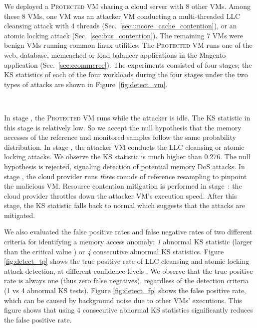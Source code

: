 \documentclass{sig-alternate}
\newcommand{\bheading}[1]{{\vspace{2pt}\noindent{\textbf{#1}}\hspace{2pt}}}
\newcommand{\RNum}[1]{\uppercase\expandafter{\romannumeral #1\relax}}
\newcommand{\attackname}{memory DoS attacks\xspace}
\newcommand{\protectedVM}{\textsc{Protected VM}\xspace}
\newcommand{\secref}[1]{\mbox{Sec.~\ref{#1}}\xspace}
\begin{document}
\bheading{Detection accuracy.}
We deployed a \protectedVM sharing a cloud server with 8 other VMs. Among these 8 
VMs, one VM was an attacker VM conducting a multi-threaded LLC cleansing attack 
with 4 threads (\secref{sec:uncore_cache_contention}), or an atomic locking attack
(\secref{sec:bus_contention}). The remaining 7 VMs were benign VMs running common 
linux utilities. The \protectedVM runs one of the web, database, 
memcached or load-balancer applications in the Magento application (\secref{sec:ecommerce}). The 
experiments consisted of four stages; the KS statistics of each of the four 
workloads during the four stages under the two types of attacks are shown in 
Figure~\ref{fig:detect_vm}.

\begin{figure*}[t]
     \centering
      \hspace*{1.5em}
      \\
    \caption{KS statistics of the \protectedVM for detecting and mitigating \attackname.}
    \label{fig:detect_vm}
\end{figure*}


In stage \RNum{1}, the \protectedVM runs while the attacker is idle. The KS
statistic in this stage is relatively low. So we accept the null hypothesis that
the memory accesses of the reference and monitored samples follow the same
probability distribution. In stage \RNum{2}, the attacker VM conducts the LLC
cleansing or atomic locking attacks. We observe the KS statistic is much higher
than 0.276. The null hypothesis is rejected, signaling detection of potential
\attackname. In stage \RNum{3}, the cloud provider runs \textit{three} rounds of
reference resampling to pinpoint the malicious VM. Resource contention
mitigation is performed in stage~\RNum{4}: the cloud provider throttles down the
attacker VM's execution speed. After this stage, the KS
statistic falls back to normal which suggests that the attacks are mitigated.

We also evaluated the false positive rates and false negative rates of two 
different criteria for identifying a memory access anomaly: {\em 1} abnormal KS
statistic (larger than the critical value ) or {\em 4} consecutive 
abnormal KS statistics. Figure \ref{fig:detect_tp} shows the true positive rate of 
LLC cleansing and atomic locking attack detection, at different confidence levels
.  We observe that the true positive rate is always one (thus zero false 
negatives), regardless of the detection criteria (1 vs 4 abnormal KS tests).  
Figure \ref{fig:detect_fp} shows the false positive rate, which can be caused by 
background noise due to other VMs' executions. This figure shows that using 4 
consecutive abnormal KS statistics significantly reduces the false positive rate.
\end{document}
